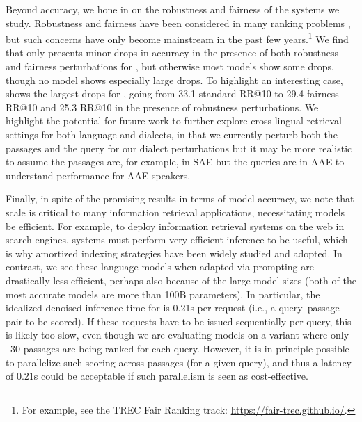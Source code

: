 
Beyond accuracy, we hone in on the robustness and fairness of the systems we study. Robustness and fairness have been considered in many ranking problems \citep[\eg][]{zehlike2017fair, singh2019policy}, but such concerns have only become mainstream in the past few years.\footnote{For example, see the TREC Fair Ranking track: \url{https://fair-trec.github.io/}.}
We find that \instructdavinci only presents minor drops in accuracy in the presence of both robustness and fairness perturbations for \msmarcotrec, but otherwise most models show some drops, though no model shows especially large drops. To highlight an interesting case, \coherexl shows the largest drops for \msmarcoregular, going from 33.1 standard RR@10 to 29.4 fairness RR@10 and 25.3 RR@10 in the presence of robustness perturbations.
We highlight the potential for future work to further explore cross-lingual retrieval settings for both language and dialects, in that we currently perturb both the passages and the query for our dialect perturbations but it may be more realistic to assume the passages are, for example, in SAE but the queries are in AAE to understand performance for AAE speakers. 

Finally, in spite of the promising results in terms of model accuracy, we note that scale is critical to many information retrieval applications, necessitating models be efficient.
For example, to deploy information retrieval systems on the web in search engines, systems must perform very efficient inference to be useful, which is why amortized indexing strategies have been widely studied and adopted. 
In contrast, we see these language models when adapted via prompting are drastically less efficient, perhaps also because of the large model sizes (\eg both of the most accurate models are more than 100B parameters).
In particular, the idealized denoised inference time for \instructdavinci is 0.21s per request (i.e., a query--passage pair to be scored). If these requests have to be issued sequentially per query, this is likely too slow, even though we are evaluating models on a variant where only ~30 passages are being ranked for each query. However, it is in principle possible to parallelize such scoring across passages (for a given query), and thus a latency of 0.21s could be acceptable if such parallelism is seen as cost-effective.



